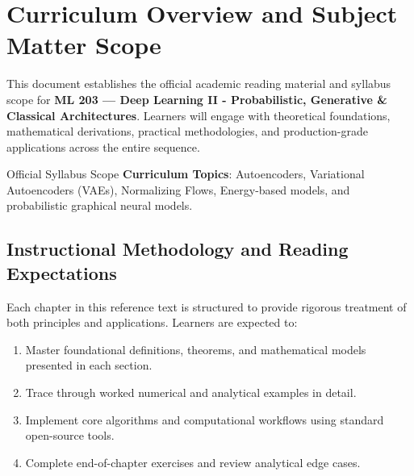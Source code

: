 \section{Curriculum Overview and Subject Matter Scope}

This document establishes the official academic reading material and syllabus scope for \textbf{ML 203 --- Deep Learning II - Probabilistic, Generative \& Classical Architectures}. Learners will engage with theoretical foundations, mathematical derivations, practical methodologies, and production-grade applications across the entire sequence.

\begin{InsightBox}{Official Syllabus Scope}
  \textbf{Curriculum Topics}: Autoencoders, Variational Autoencoders (VAEs), Normalizing Flows, Energy-based models, and probabilistic graphical neural models.
\end{InsightBox}

\subsection{Instructional Methodology and Reading Expectations}

Each chapter in this reference text is structured to provide rigorous treatment of both principles and applications. Learners are expected to:
\begin{enumerate}
  \item Master foundational definitions, theorems, and mathematical models presented in each section.
  \item Trace through worked numerical and analytical examples in detail.
  \item Implement core algorithms and computational workflows using standard open-source tools.
  \item Complete end-of-chapter exercises and review analytical edge cases.
\end{enumerate}

